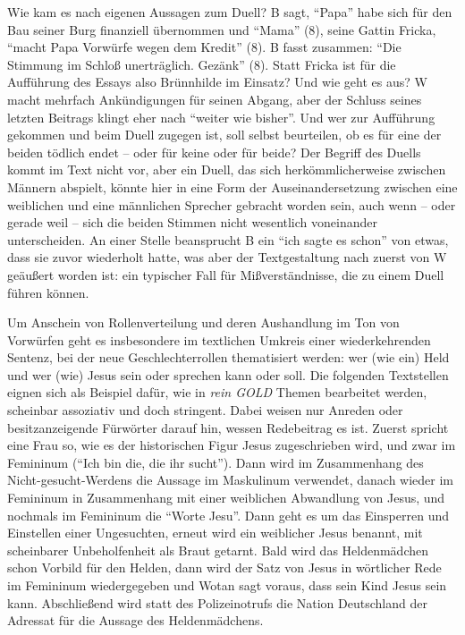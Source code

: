 \documentclass[fontsize=12pt]{scrartcl}
\begin{document}
Wie kam es nach eigenen Aussagen zum Duell? B sagt, "`Papa"' habe sich f\"ur den Bau seiner Burg finanziell \"ubernommen und "`Mama"' (8), seine Gattin Fricka, "`macht Papa Vorw\"urfe wegen dem Kredit"' (8). B fasst zusammen: "`Die Stimmung im Schlo{\ss} unertr\"aglich. Gez\"ank"' (8). Statt Fricka ist f\"ur die Auff\"uh\-rung des Essays also Br\"unnhilde im Einsatz? Und wie geht es aus? W macht mehrfach Ank\"undigungen f\"ur seinen Abgang, aber der Schluss seines letzten Beitrags klingt eher nach "`weiter wie bis\-her"'. Und wer zur Auff\"uh\-rung gekommen und beim Duell zugegen ist, soll \mbox{selbst} beurteilen, ob es f\"ur eine\textsuperscript{\tiny *} der beiden t\"odlich endet -- oder f\"ur keine\textsuperscript{\tiny *} oder f\"ur beide? Der Begriff des Duells kommt im Text nicht vor, aber ein Duell, das sich herk\"ommlicherweise zwischen M\"annern abspielt, k\"onnte \mbox{hier} in eine Form der Aus\-ein\-andersetzung zwischen eine\textsuperscript{\tiny *} weiblichen und eine\textsuperscript{\tiny *} m\"annlichen Sprecher\textsuperscript{\tiny *} gebracht worden sein, auch wenn -- oder gerade weil -- sich die beiden Stimmen nicht we\-sent\-lich voneinander unterscheiden. An einer Stelle beansprucht B ein "`ich sagte es schon"' von etwas, dass sie zuvor wiederholt hatte, was aber der Textgestaltung nach zuerst von W ge\"au{\ss}ert worden ist: ein ty\-pischer Fall f\"ur Mi{\ss}verst\"andnisse, die zu einem Duell f\"uhren k\"onnen. 

Um Anschein von Rollenverteilung und deren Aushandlung im Ton von Vorw\"urfen geht es insbesondere im textlichen Umkreis einer wiederkehrenden Sentenz, bei der neue Geschlechterrollen thematisiert werden: wer (wie ein) Held und wer (wie) Jesus sein oder sprechen kann oder soll. Die folgenden Textstellen eignen sich als Beispiel daf\"ur, wie in \textit{rein GOLD} Themen bearbeitet werden, scheinbar assoziativ und doch stringent. Dabei weisen nur Anreden oder besitzanzeigende F\"urw\"orter darauf hin, wessen Redebeitrag es ist. Zuerst spricht eine Frau so, wie es der historischen Figur Jesus zugeschrieben wird, und zwar im Femininum ("`Ich bin die, die ihr sucht"'). Dann wird im Zusammenhang des Nicht-gesucht-Werdens die Aussage im Maskulinum verwendet, danach wieder im Femininum in Zusammenhang mit einer weiblichen Abwandlung von Jesus, und nochmals im Femininum die "`Worte Jesu"'. Dann geht es um das Einsperren und Einstellen einer Ungesuchten, erneut wird ein weiblicher Jesus benannt, mit scheinbarer Unbeholfenheit als Braut getarnt. Bald wird das Heldenm\"adchen schon Vorbild f\"ur den Helden, dann wird der Satz von Jesus in w\"ortlicher Rede im Femininum wiedergegeben und Wotan sagt voraus, dass sein Kind Jesus sein kann. Abschlie{\ss}end wird statt des Polizeinotrufs die Nation Deutschland der Adressat f\"ur die Aussage des Heldenm\"adchens.
\end{document}

